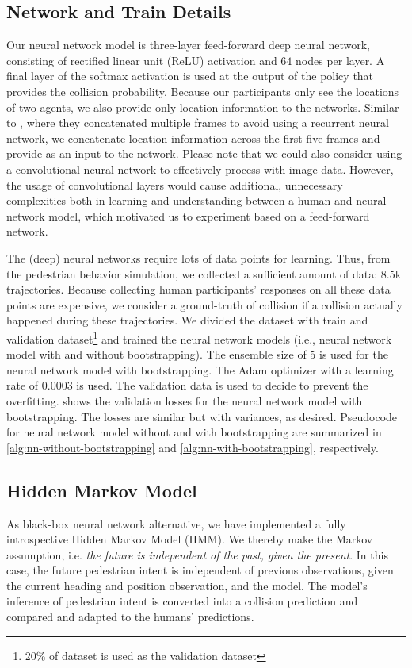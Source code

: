 \subsection{Network and Train Details}
Our neural network model is three-layer feed-forward deep neural network, consisting of rectified linear unit (ReLU) activation and $64$ nodes per layer.
A final layer of the softmax activation is used at the output of the policy that provides the collision probability. 
Because our participants only see the locations of two agents, we also provide only location information to the networks. 
Similar to \cite{mnih2015humanlevel}, where they concatenated multiple frames to avoid using a recurrent neural network, we concatenate location information across the first five frames and provide as an input to the network.
Please note that we could also consider using a convolutional neural network to effectively process with image data. 
However, the usage of convolutional layers would cause additional, unnecessary complexities both in learning and understanding between a human and neural network model, which motivated us to experiment based on a feed-forward network.

The (deep) neural networks require lots of data points for learning. 
Thus, from the pedestrian behavior simulation, we collected a sufficient amount of data: $8.5$k trajectories. 
Because collecting human participants' responses on all these data points are expensive, we consider a ground-truth of collision if a collision actually happened during these trajectories.
We divided the dataset with train and validation dataset\footnote{$20$\% of dataset is used as the validation dataset} and trained the neural network models (i.e., neural network model with and without bootstrapping). 
The ensemble size of $5$ is used for the neural network model with bootstrapping. 
The Adam optimizer with a learning rate of $0.0003$ is used. 
The validation data is used to decide to prevent the overfitting. 
 shows the validation losses for the neural network model with bootstrapping. 
The losses are similar but with variances, as desired. 
Pseudocode for neural network model without and with bootstrapping are summarized in \cref{alg:nn-without-bootstrapping} and \cref{alg:nn-with-bootstrapping}, respectively. 

\subsection{Hidden Markov Model}
As black-box neural network alternative, we have implemented a fully introspective Hidden Markov Model (HMM). We thereby make the Markov assumption, i.e. \textit{the future is independent of the past, given the present}. In this case, the future pedestrian intent is independent of previous observations, given the current heading and position observation, and the model. The model's inference of pedestrian intent is converted into a collision prediction and compared and adapted to the humans' predictions. 

